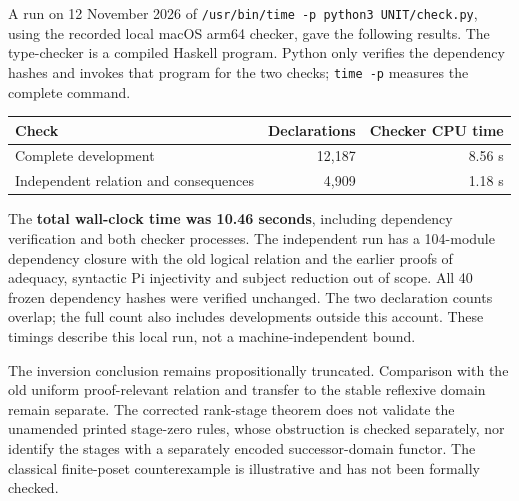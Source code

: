 \documentclass[11pt,a4paper]{article}
\theoremstyle{definition}
\theoremstyle{remark}
\begin{document}
A run on 12 November 2026 of
\texttt{/usr/bin/time -p python3 UNIT/check.py}, using the recorded local
macOS arm64 checker, gave the following results. The type-checker is a
compiled Haskell program. Python only verifies the dependency hashes and
invokes that program for the two checks; \texttt{time -p} measures the
complete command.
\begin{center}
\begin{tabular}{lrr}
\hline
Check & Declarations & Checker CPU time\\
\hline
Complete development & 12,187 & 8.56 s\\
Independent relation and consequences & 4,909 & 1.18 s\\
\hline
\end{tabular}
\end{center}
The \textbf{total wall-clock time was 10.46 seconds}, including dependency
verification and both checker processes. The independent run has a
104-module dependency closure with the old logical relation and the earlier
proofs of adequacy, syntactic Pi injectivity and subject reduction out of scope. All 40 frozen
dependency hashes were verified unchanged. The two declaration counts
overlap; the full count also includes developments outside this account.
These timings describe this local run, not a machine-independent bound.

The inversion conclusion remains propositionally truncated. Comparison
with the old uniform proof-relevant relation and transfer to the stable
reflexive domain remain separate. The corrected rank-stage theorem does
not validate the unamended printed stage-zero rules, whose obstruction is
checked separately, nor identify the stages with a separately encoded
successor-domain functor. The classical finite-poset counterexample is
illustrative and has not been formally checked.
\end{document}
